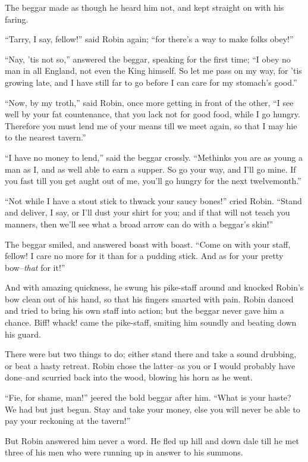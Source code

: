 The beggar made as though he heard him not, and kept straight on with
his faring.

``Tarry, I say, fellow!'' said Robin again; ``for there's a way to make
folks obey!''

``Nay, 'tis not so,'' answered the beggar, speaking for the first time;
``I obey no man in all England, not even the King himself. So let me
pass on my way, for 'tis growing late, and I have still far to go before
I can care for my stomach's good.''

``Now, by my troth,'' said Robin, once more getting in front of the
other, ``I see well by your fat countenance, that you lack not for good
food, while I go hungry. Therefore you must lend me of your means till
we meet again, so that I may hie to the nearest tavern.''

``I have no money to lend,'' said the beggar crossly. ``Methinks you are
as young a man as I, and as well able to earn a supper. So go your way,
and I'll go mine. If you fast till you get aught out of me, you'll go
hungry for the next twelvemonth.''

``Not while I have a stout stick to thwack your saucy bones!'' cried
Robin. ``Stand and deliver, I say, or I'll dust your shirt for you; and
if that will not teach you manners, then we'll see what a broad arrow
can do with a beggar's skin!''

The beggar smiled, and answered boast with boast. ``Come on with your
staff, fellow! I care no more for it than for a pudding stick. And as
for your pretty bow--\emph{that} for it!''

And with amazing quickness, he swung his pike-staff around and knocked
Robin's bow clean out of his hand, so that his fingers smarted with
pain. Robin danced and tried to bring his own staff into action; but the
beggar never gave him a chance. Biff! whack! came the pike-staff,
smiting him soundly and beating down his guard.

There were but two things to do; either stand there and take a sound
drubbing, or beat a hasty retreat. Robin chose the latter--as you or I
would probably have done--and scurried back into the wood, blowing his
horn as he went.

``Fie, for shame, man!'' jeered the bold beggar after him. ``What is
your haste? We had but just begun. Stay and take your money, else you
will never be able to pay your reckoning at the tavern!''

But Robin answered him never a word. He fled up hill and down dale till
he met three of his men who were running up in answer to his summons.

